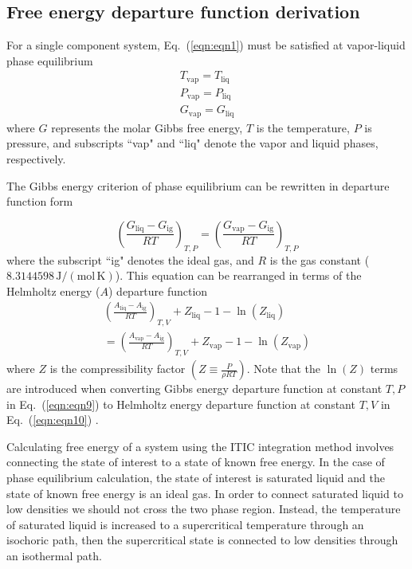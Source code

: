 \documentclass[5p,times]{elsarticle}
\begin{document}
\subsection{Free energy departure function derivation}
For a single component system, Eq.~(\ref{eqn:eqn1}) must be satisfied at vapor-liquid phase equilibrium
\begin{equation}
\begin{array}{l}
{T_\mathrm{vap} =T_\mathrm{liq} }\\
{P_\mathrm{vap} =P_\mathrm{liq} }\\
{G_\mathrm{vap} =G_\mathrm{liq} }
\end{array} 
\label{eqn:eqn1}
\end{equation}
where $G$ represents the molar Gibbs free energy, $T$ is the temperature, $P$ is pressure, and subscripts ``vap" and ``liq" denote the vapor and liquid phases, respectively. 

The Gibbs energy criterion of phase equilibrium can be rewritten in departure function form

\begin{equation}
\left(\frac{G_\mathrm{liq} -G_\mathrm{ig} }{RT}\right)_{T,P} =\left(\frac{G_\mathrm{vap}-G_\mathrm{ig}}{RT}\right)_{T,P} \label{eqn:eqn9}
\end{equation}
where the subscript ``ig" denotes the ideal gas, and $R$ is the gas constant ($8.3144598\,\mathrm{J/(mol\,K)}$). This equation can be rearranged in terms of the Helmholtz energy ($A$) departure function 
\begin{equation}
\begin{array}{l}
{\left(\frac{A_\mathrm{liq} -A_\mathrm{ig} }{RT} \right)_{T,V} +Z_{\mathrm{liq}} -1-\ln(Z_{\mathrm{liq}})} 
\\ 
{=\left(\frac{A_\mathrm{vap} -A_\mathrm{ig} }{RT} \right)_{T,V} +Z_{\mathrm{vap}} -1-\ln(Z_{\mathrm{vap}})}  
\end{array} 
\label{eqn:eqn10}
\end{equation}
where $Z$ is the compressibility factor $(Z \equiv \frac{P}{\rho RT})$. Note that the $\ln(Z)$ terms are introduced when converting Gibbs energy departure function at constant $T,P$ in Eq.~(\ref{eqn:eqn9}) to Helmholtz energy departure function at constant $T,V$ in Eq.~(\ref{eqn:eqn10}) \cite{Elliott1999}. 

Calculating free energy of a system using the ITIC integration method involves connecting the state of interest to a state of known free energy. In the case of phase equilibrium calculation, the state of interest is saturated liquid and the state of known free energy is an ideal gas. In order to connect saturated liquid to low densities we should not cross the two phase region. Instead, the temperature of saturated liquid is increased to a supercritical temperature through an isochoric path, then the supercritical state is connected to low densities through an isothermal path.  
\end{document}
